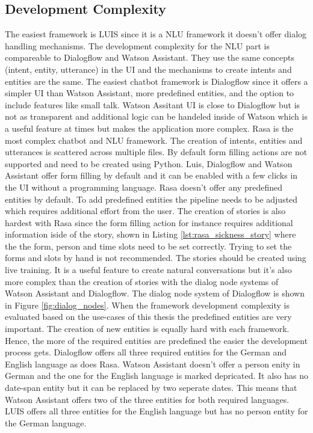 \subsection*{Development Complexity}
The easiest framework is LUIS since it is a NLU framework it doesn't
offer dialog handling mechanisms.
The development complexity for the NLU part is compareable to Dialogflow and 
Watson Assistant.
They use the same concepts (intent, entity, utterance) in the UI and the 
mechanisms to create intents and entities are the same.
The easiest chatbot framework is Dialogflow since it offers a simpler UI 
than Watson Assistant, more predefined entities, and the option to 
include features like small talk.
Watson Assitant UI is close to Dialogflow but is not as transparent 
and additional logic can be handeled inside of Watson which is a
useful feature at times but makes the application more complex.
Rasa is the most complex chatbot and NLU framework.
The creation of intents, entities and utterances is scattered across multiple files.
By default form filling actions are not supported and need to be created using Python.
Luis, Dialogflow and Watson Assistant offer form filling by default and it can be enabled with a 
few clicks in the UI without a programming language.
Rasa doesn't offer any predefined entities  by default.
To add predefined entities the pipeline needs to be adjusted which requires additional effort 
from the user.
The creation of stories is also hardest with Rasa since the form filling action for instance 
requires additional information iside of the story, shown in Listing \ref{lst:rasa_sickness_story}
where the the form, person and time slots need to be set correctly.
Trying to set the forms and slots by hand is not recommended.
The stories should be created using live training.
It is a useful feature to create natural conversations but it's also more complex than the 
creation of stories with the dialog node systems of Watson Assistant and Dialogflow.
The dialog node system of Dialogflow is shown in Figure \ref{fig:dialog_nodes}.
When the framework development complexity is evaluated based on the use-cases of this thesis 
the predefined entities are very important.
The creation of new entities is equally hard with each framework.
Hence, the more of the required entities are predefined the easier the development process gets.
Dialogflow offers all three required entities for the German and English language as does 
Rasa.
Watson Assistant doesn't offer a person enity in German and the one for the English language is marked depricated.
It also has no date-span entity but it can be replaced by two seperate dates.
This means that Watson Assistant offers two of the three entities for both required languages. 
LUIS offers all three entities for the English language but has no person entity for the German language. 





